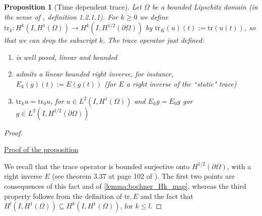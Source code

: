 \documentclass[english,a4paper,10pt,oneside]{scrbook}	%
\theoremstyle{break}
\newtheorem{prop}[equation]{Proposition}
\newenvironment{mproof}[1][\proofname]{%
  \begin{proof}[#1]$ $\par\nobreak\ignorespaces
}{%
  \end{proof}
}
\renewcommand*{\proofname}{Proof}
\theoremstyle{remark}
\newcommand{\tr}{\text{tr}}
\newcommand{\emb}{\hookrightarrow}
\begin{document}
\begin{appendices}
\begin{prop}[Time dependent trace]
\label{prop:trace}
Let $\Omega$ be a bounded Lipschitz domain (in the sense of \cite{grisvard}, definition 1.2.1.1). For $k\geq 0$ we define $\tr_k: H^k(I,H^1(\Omega))\rightarrow H^k(I, H^{1/2} (\partial \Omega))$ by $\tr_K(u)(t):=\tr(u(t))$, so that we can drop the subscript $k$. The trace operator just defined:
\begin{enumerate}
\item is well posed, linear and bounded
\item admits a linear bounded right inverse, for instance, $E_k(g)(t):=E(g(t))$ (for $E$ a right inverse of the ``static" trace)
\item $\tr_k u = \tr_0 u$, for $u \in L^2(I,H^1(\Omega))$ and $E_k g = E_0g$ gor $g \in L^2(I,H^{1/2}(\partial \Omega))$
\end{enumerate}
\end{prop}
\begin{mproof}

\underline{Proof of the proposition}

We recall that the trace operator is bounded surjective onto $H^{1/2}(\partial \Omega)$, with a right inverse $E$ (see theorem 3.37 at page 102 of \cite{mclean}). The first two points are consequences of this fact and of \cref{lemma:bochner_Hk_map}, whereas the third property follows from the definition of $\tr, E$ and the fact that $H^l(I,H^1(\Omega))\subseteq H^k(I,H^1(\Omega))$, for $k\leq l$.



\end{mproof}
\end{appendices}
\end{document}
